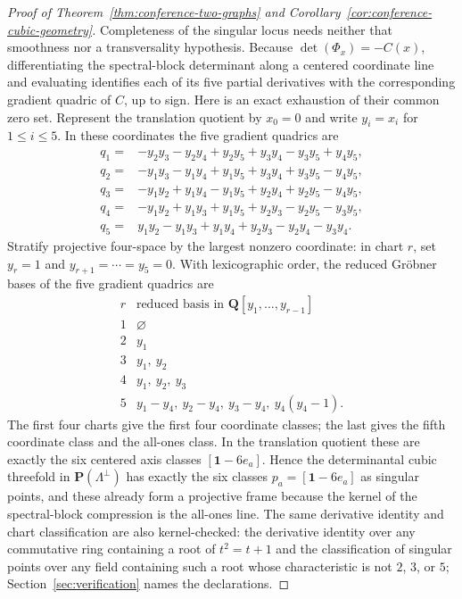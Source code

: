 \documentclass[11pt]{article}
\theoremstyle{definition}
\theoremstyle{remark}
\begin{document}
\begin{proof}[Proof of Theorem~\ref{thm:conference-two-graphs} and
Corollary~\ref{cor:conference-cubic-geometry}]
Completeness of the singular locus needs neither that smoothness nor a
transversality hypothesis.  Because $\det(\Phi_x)=-C(x)$, differentiating
the spectral-block determinant along a centered coordinate line and
evaluating identifies each of its five partial derivatives with the
corresponding gradient quadric of $C$, up to sign. Here is an exact
exhaustion of their common zero set. Represent the translation quotient by
$x_0=0$ and write $y_i=x_i$ for $1\le i\le5$. In these coordinates the
five gradient quadrics are
\[
\begin{aligned}
q_1={}&-y_2y_3-y_2y_4+y_2y_5+y_3y_4-y_3y_5+y_4y_5,\\
q_2={}&-y_1y_3-y_1y_4+y_1y_5+y_3y_4+y_3y_5-y_4y_5,\\
q_3={}&-y_1y_2+y_1y_4-y_1y_5+y_2y_4+y_2y_5-y_4y_5,\\
q_4={}&-y_1y_2+y_1y_3+y_1y_5+y_2y_3-y_2y_5-y_3y_5,\\
q_5={}& y_1y_2-y_1y_3+y_1y_4+y_2y_3-y_2y_4-y_3y_4.
\end{aligned}
\]
Stratify projective
four-space by the largest nonzero coordinate: in chart $r$, set $y_r=1$
and $y_{r+1}=\cdots=y_5=0$. With lexicographic order, the reduced
Gr\"obner bases of the five gradient quadrics are
\[
\begin{array}{c|l}
r&\text{reduced basis in }\mathbf Q[y_1,\ldots,y_{r-1}]\\
\hline
1&\varnothing\\
2&y_1\\
3&y_1,\ y_2\\
4&y_1,\ y_2,\ y_3\\
5&y_1-y_4,\ y_2-y_4,\ y_3-y_4,\ y_4(y_4-1).
\end{array}
\]
The first four charts give the first four coordinate classes; the last
gives the fifth coordinate class and the all-ones class. In the translation
quotient these are exactly the six centered axis classes
$[\mathbf1-6e_a]$. Hence the determinantal cubic threefold in
$\mathbf P(\Lambda^\perp)$ has exactly the six classes
$p_a=[\mathbf1-6e_a]$ as singular points, and these already form a
projective frame because the kernel of the spectral-block compression is the
all-ones line. The same derivative identity and chart classification are
also kernel-checked: the derivative identity over
any commutative ring containing a root of $t^2=t+1$ and the classification
of singular points over any field containing such a root whose
characteristic is not $2$, $3$, or $5$;
Section~\ref{sec:verification} names the declarations.


\end{proof}
\end{document}
